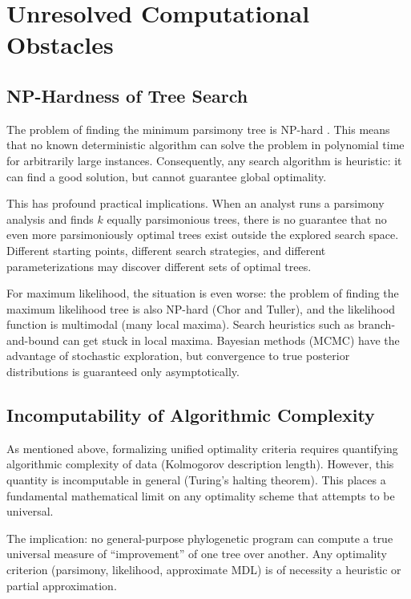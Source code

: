 \section{Unresolved Computational Obstacles}

\subsection{NP-Hardness of Tree Search}

The problem of finding the minimum parsimony tree is NP-hard \parencite{graur1991}. This means that no known deterministic algorithm can solve the problem in polynomial time for arbitrarily large instances. Consequently, any search algorithm is heuristic: it can find a good solution, but cannot guarantee global optimality.

This has profound practical implications. When an analyst runs a parsimony analysis and finds $k$ equally parsimonious trees, there is no guarantee that no even more parsimoniously optimal trees exist outside the explored search space. Different starting points, different search strategies, and different parameterizations may discover different sets of optimal trees.

For maximum likelihood, the situation is even worse: the problem of finding the maximum likelihood tree is also NP-hard (Chor and Tuller), and the likelihood function is multimodal (many local maxima). Search heuristics such as branch-and-bound can get stuck in local maxima. Bayesian methods (MCMC) have the advantage of stochastic exploration, but convergence to true posterior distributions is guaranteed only asymptotically.

\subsection{Incomputability of Algorithmic Complexity}

As mentioned above, formalizing unified optimality criteria requires quantifying algorithmic complexity of data (Kolmogorov description length). However, this quantity is incomputable in general (Turing's halting theorem). This places a fundamental mathematical limit on any optimality scheme that attempts to be universal.

The implication: no general-purpose phylogenetic program can compute a true universal measure of ``improvement'' of one tree over another. Any optimality criterion (parsimony, likelihood, approximate MDL) is of necessity a heuristic or partial approximation.

